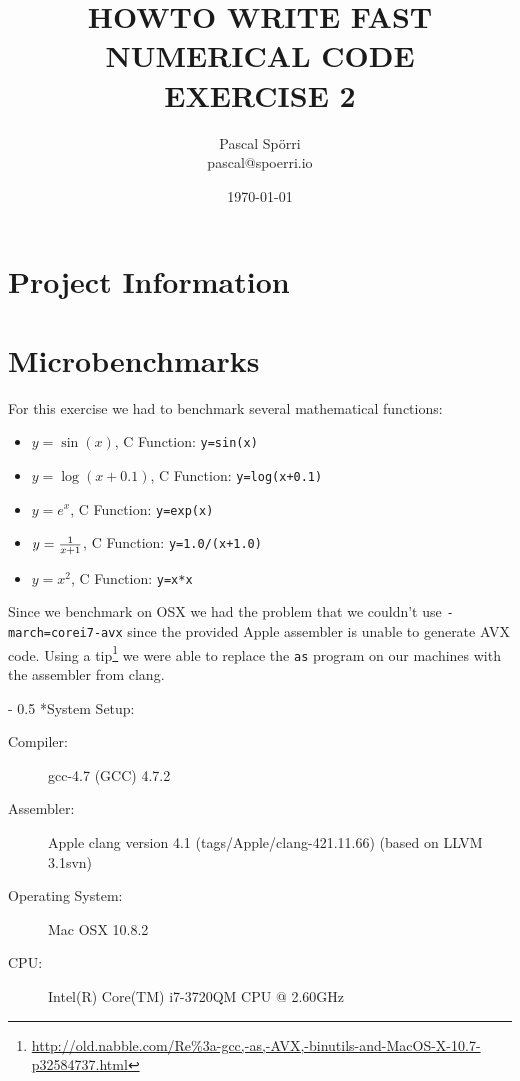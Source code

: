 \documentclass[portrait,a4paper]{article}
\makeatletter
\renewcommand\paragraph{\@startsection{paragraph}{4}{0mm}%
    {-\baselineskip}%
    {0.5\baselineskip}%
    {\normalfont\bfseries}%
}%
\makeatother
\begin{document}
 \author{Pascal Spörri\\pascal@spoerri.io}
 \title{HOWTO WRITE FAST NUMERICAL CODE\\ EXERCISE 2}
 \date{\today}
\maketitle

\section{Project Information}
\section{Microbenchmarks}
For this exercise we had to benchmark several mathematical functions:
\begin{itemize}
    \item $y=\sin(x)$, C Function: \lstinline{y=sin(x)}
    \item $y=\log(x+0.1)$, C Function: \lstinline{y=log(x+0.1)}
    \item $y=e^x$, C Function: \lstinline{y=exp(x)}
    \item $y={1\over x+1}$, C Function: \lstinline{y=1.0/(x+1.0)}
    \item $y=x^2$, C Function: \lstinline{y=x*x}
\end{itemize}
Since we benchmark on OSX we had the problem that we couldn't use \lstinline{-march=corei7-avx} since the provided Apple assembler is unable to generate AVX code. Using a tip\footnote{\url{http://old.nabble.com/Re\%3a-gcc,-as,-AVX,-binutils-and-MacOS-X-10.7-p32584737.html}} we were able to replace the \lstinline{as} program on our machines with the assembler from clang. 

\paragraph*{System Setup:}
\begin{description}
    \item[Compiler:] gcc-4.7 (GCC) 4.7.2
    \item[Assembler:] Apple clang version 4.1 (tags/Apple/clang-421.11.66) (based on LLVM 3.1svn)
    \item[Operating System:] Mac OSX 10.8.2
    \item[CPU:] Intel(R) Core(TM) i7-3720QM CPU @ 2.60GHz
\end{description}
\end{document}

